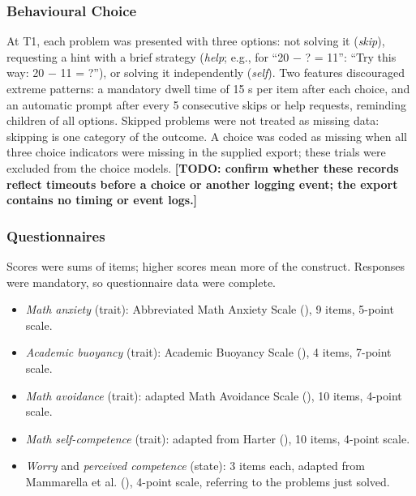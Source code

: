 \documentclass[
  man,
  floatsintext,
  longtable,
  nolmodern,
  notxfonts,
  notimes,
  colorlinks=true,linkcolor=blue,citecolor=blue,urlcolor=blue]{apa7}
\providecommand{\tightlist}{%
  \setlength{\itemsep}{0pt}\setlength{\parskip}{0pt}}
\begin{document}
\subsubsection{Behavioural Choice}\label{behavioural-choice}

At T1, each problem was presented with three options: not solving it
(\emph{skip}), requesting a hint with a brief strategy (\emph{help};
e.g., for ``20 − ? = 11'': ``Try this way: 20 − 11 = ?''), or solving it
independently (\emph{self}). Two features discouraged extreme patterns:
a mandatory dwell time of 15 s per item after each choice, and an
automatic prompt after every 5 consecutive skips or help requests,
reminding children of all options. Skipped problems were not treated as
missing data: skipping is one category of the outcome. A choice was
coded as missing when all three choice indicators were missing in the
supplied export; these trials were excluded from the choice models.
\textbf{{[}TODO: confirm whether these records reflect timeouts before a
choice or another logging event; the export contains no timing or event
logs.{]}}

\subsubsection{Questionnaires}\label{questionnaires}

Scores were sums of items; higher scores mean more of the construct.
Responses were mandatory, so questionnaire data were complete.

\begin{itemize}
\tightlist
\item
  \emph{Math anxiety} (trait): Abbreviated Math Anxiety Scale
  (), 9 items, 5-point
  scale.
\item
  \emph{Academic buoyancy} (trait): Academic Buoyancy Scale
  (), 4 items, 7-point
  scale.
\item
  \emph{Math avoidance} (trait): adapted Math Avoidance Scale
  (), 10 items, 4-point
  scale.
\item
  \emph{Math self-competence} (trait): adapted from Harter
  (), 10 items, 4-point scale.
\item
  \emph{Worry} and \emph{perceived competence} (state): 3 items each,
  adapted from Mammarella et al. (),
  4-point scale, referring to the problems just solved.
\end{itemize}
\end{document}
